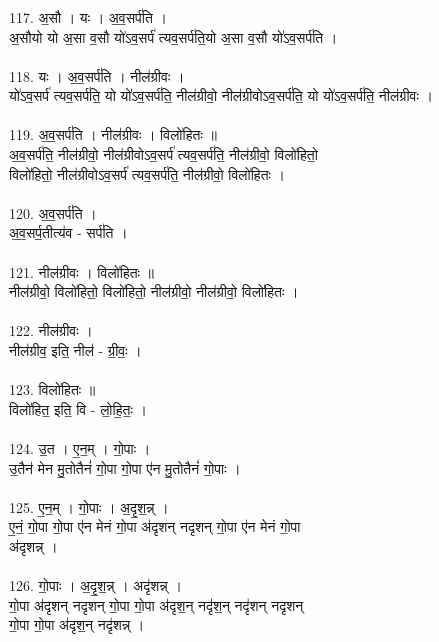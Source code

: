 \subsubsection{}
117. अ॒सौ । यः । अ॒व॒सर्प॑ति ।\\
अ॒सौयो यो अ॒सा व॒सौ यो॑ऽव॒सर्प॑ त्यव॒सर्प॑ति॒यो अ॒सा व॒सौ यो॑ऽव॒सर्प॑ति ।\\
\\
118. यः । अ॒व॒सर्प॑ति । नील॑ग्रीवः ।\\
यो॑ऽव॒सर्प॑ त्यव॒सर्प॑ति॒ यो यो॑ऽव॒सर्प॑ति॒ नील॑ग्रीवो॒ नील॑ग्रीवोऽव॒सर्प॑ति॒ यो यो॑ऽव॒सर्प॑ति॒ नील॑ग्रीवः ।\\
\\
119. अ॒व॒सर्प॑ति । नील॑ग्रीवः । विलो॑हितः ॥\\
अ॒व॒सर्प॑ति॒ नील॑ग्रीवो॒ नील॑ग्रीवोऽव॒सर्प॑ त्यव॒सर्प॑ति॒ नील॑ग्रीवो॒ विलो॑हितो॒\\
विलो॑हितो॒ नील॑ग्रीवोऽव॒सर्प॑ त्यव॒सर्प॑ति॒ नील॑ग्रीवो॒ विलो॑हितः ।\\
\\
120. अ॒व॒सर्प॑ति ।\\
अ॒व॒सर्प॒तीत्य॑व - सर्प॑ति ।\\
\\
121. नील॑ग्रीवः । विलो॑हितः ॥\\
नील॑ग्रीवो॒ विलो॑हितो॒ विलो॑हितो॒ नील॑ग्रीवो॒ नील॑ग्रीवो॒ विलो॑हितः ।\\
\\
122. नील॑ग्रीवः ।\\
नील॑ग्रीव॒ इति॒ नील॑ - ग्री॒वः॒ ।\\
\\
123. विलो॑हितः ॥\\
विलो॑हित॒ इति॒ वि - लो॒हि॒तः॒ ।\\
\\
124. उ॒त । ए॒न॒म् । गो॒पाः ।\\
उ॒तैन॑ मेन मु॒तोतैनं॑ गो॒पा गो॒पा ए॑न मु॒तोतैनं॑ गो॒पाः ।\\
\\
125. ए॒न॒म् । गो॒पाः । अ॒दृ॒श॒न्न् ।\\
ए॒नं॒ गो॒पा गो॒पा ए॑न मेनं गो॒पा अ॑दृशन् नदृशन् गो॒पा ए॑न मेनं गो॒पा\\
अ॑दृशन्न् ।\\
\\
126. गो॒पाः । अ॒दृ॒श॒न्न् । अदृ॑शन्न् ।\\
गो॒पा अ॑दृशन् नदृशन् गो॒पा गो॒पा अ॑दृश॒न् नदृ॑श॒न् नदृ॑शन् नदृशन्\\
गो॒पा गो॒पा अ॑दृश॒न् नदृ॑शन्न् ।\\
\\
